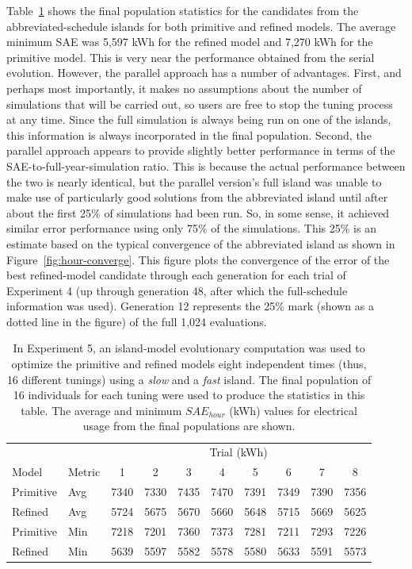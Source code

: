 \documentclass[preprint, review, 12pt]{elsarticle}
\begin{document}
Table~\ref{tab:hourly-parallel} shows the final population statistics for the candidates from the abbreviated-schedule islands for both primitive and refined models. The average minimum SAE was 5,597 kWh for the refined model and 7,270 kWh for the primitive model. This is very near the performance obtained from the serial evolution. However, the parallel approach has a number of advantages. First, and perhaps most importantly, it makes no assumptions about the number of simulations that will be carried out, so users are free to stop the tuning process at any time. Since the full simulation is always being run on one of the islands, this information is always incorporated in the final population. Second, the parallel approach appears to provide slightly better performance in terms of the SAE-to-full-year-simulation ratio. This is because the actual performance between the two is nearly identical, but the parallel version's full island was unable to make use of particularly good solutions from the abbreviated island until after about the first 25\% of simulations had been run. So, in some sense, it achieved similar error performance using only 75\% of the simulations. This 25\% is an estimate based on the typical convergence of the abbreviated island as shown in Figure~\ref{fig:hour-converge}. This figure plots the convergence of the error of the best refined-model candidate through each generation for each trial of Experiment 4 (up through generation 48, after which the full-schedule information was used). Generation 12 represents the 25\% mark (shown as a dotted line in the figure) of the full 1,024 evaluations.

\begin{table}[htbp]
\centering
\caption{In Experiment 5, an island-model evolutionary computation was used to optimize the primitive and refined models eight independent times (thus, 16 different tunings) using a \emph{slow} and a \emph{fast} island. The final population of 16 individuals for each tuning were used to produce the statistics in this table. The average and minimum $SAE_{hour}$ (kWh) values for electrical usage from the final populations are shown.}
\label{tab:hourly-parallel}
\begin{tabular}{llcccccccc}
\toprule
 &  & \multicolumn{8}{c}{Trial (kWh)}\\
Model & Metric & 1 & 2 & 3 & 4 & 5 & 6 & 7 & 8\\
\midrule
Primitive & Avg & 7340 & 7330 & 7435 & 7470 & 7391 & 7349 & 7390 & 7356\\\rowcolor{DarkRow}
Refined   & Avg & 5724 & 5675 & 5670 & 5660 & 5648 & 5715 & 5669 & 5625\\
Primitive & Min & 7218 & 7201 & 7360 & 7373 & 7281 & 7211 & 7293 & 7226\\\rowcolor{DarkRow}
Refined   & Min & 5639 & 5597 & 5582 & 5578 & 5580 & 5633 & 5591 & 5573\\
\bottomrule
\end{tabular}
\end{table}
\end{document}
